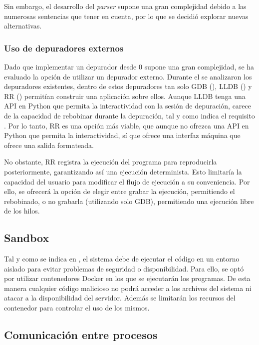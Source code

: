 Sin embargo, el desarrollo del \textit{\gls{parser}} supone una gran complejidad debido a las numerosas sentencias que tener en cuenta, por lo que se decidió explorar nuevas alternativas.

\subsubsection{Uso de depuradores externos} \label{sec:depuradores-externos}

Dado que implementar un depurador desde 0 supone una gran complejidad, se ha evaluado la opción de utilizar un depurador externo. Durante el  se analizaron los depuradores existentes, dentro de estos depuradores tan solo GDB (), LLDB () y RR () permitían construir una aplicación sobre ellos. Aunque LLDB tenga una API en Python que permita la interactividad con la sesión de depuración, carece de la capacidad de rebobinar durante la depuración, tal y como indica el requisito . Por lo tanto, RR es una opción más viable, que aunque no ofrezca una API en Python que permita la interactividad, sí que ofrece una interfaz máquina que ofrece una salida formateada.

No obstante, RR registra la ejecución del programa para reproducirla posteriormente, garantizando así una ejecución determinista. Esto limitaría la capacidad del usuario para modificar el flujo de ejecución a su conveniencia. Por ello, se ofrecerá la opción de elegir entre grabar la ejecución, permitiendo el rebobinado, o no grabarla (utilizando solo GDB), permitiendo una ejecución libre de los hilos.

\subsection{Sandbox} \label{sec:sandbox}

Tal y como se indica en , el sistema debe de ejecutar el código en un entorno aislado para evitar problemas de seguridad o disponibilidad. Para ello, se optó por utilizar contenedores Docker en los que se ejecutarán los programas. De esta manera cualquier código malicioso no podrá acceder a los archivos del sistema ni atacar a la disponibilidad del servidor. Además se limitarán los recursos del contenedor para controlar el uso de los mismos.

\subsection{Comunicación entre procesos} \label{sec:comunicacion-procesos}





